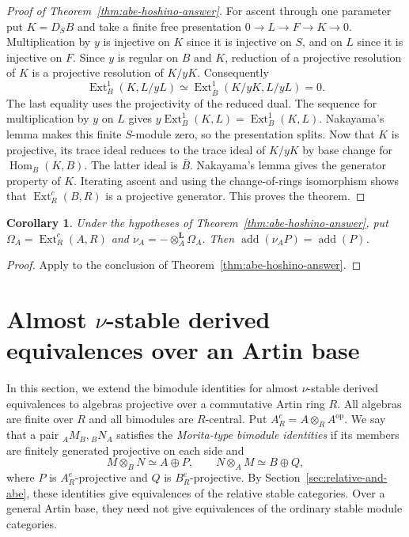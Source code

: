 \documentclass[12pt,a4paper,english,reqno]{amsart}
\numberwithin{equation}{section}
\theoremstyle{plain}
\newtheorem{corollary}[theorem]{Corollary}
\theoremstyle{definition}
\begin{document}
\begin{proof}[Proof of Theorem~\ref{thm:abe-hoshino-answer}]
For ascent through one parameter put $K=D_SB$ and take a finite
free presentation $0\to L\to F\to K\to 0$. Multiplication by
$y$ is injective on $K$ since it is injective on $S$, and on
$L$ since it is injective on $F$. Since $y$ is regular on
$B$ and $K$, reduction of a projective resolution of $K$ is a
projective resolution of $K/yK$. Consequently
\[
 \operatorname{Ext}_B^1(K,L/yL)
  \simeq \operatorname{Ext}_{\bar B}^1(K/yK,L/yL)=0.
\]
The last equality uses the projectivity of the reduced dual.
The sequence for multiplication by $y$ on $L$ gives
$y\operatorname{Ext}_B^1(K,L)=\operatorname{Ext}_B^1(K,L)$.
Nakayama's lemma makes this finite $S$-module zero, so the
presentation splits. Now that $K$ is projective, its trace
ideal reduces to the trace ideal of $K/yK$ by base change
for $\operatorname{Hom}_B(K,B)$. The latter ideal is $\bar B$.
Nakayama's lemma gives the generator property of $K$.
Iterating ascent and using the change-of-rings isomorphism
shows that $\operatorname{Ext}^c_R(B,R)$ is a projective
generator. This proves the theorem.
\end{proof}

\begin{corollary}\label{cor:abe-hoshino-nakayama}
Under the hypotheses of Theorem~\ref{thm:abe-hoshino-answer}, put
$\Omega_A=\operatorname{Ext}_R^c(A,R)$ and
$\nu_A=-\otimes_A^{\mathbf L}\Omega_A$. Then
$\operatorname{add}(\nu_A P)=\operatorname{add}(P)$.
\end{corollary}

\begin{proof}
Apply \cite[Corollary~4.4]{AbeHoshino2009} to the conclusion of
Theorem~\ref{thm:abe-hoshino-answer}.
\end{proof}

\section{Almost \texorpdfstring{$\nu$}{nu}-stable derived equivalences over an Artin base}
\label{anu-sec}

In this section, we extend the bimodule identities for almost
$\nu$-stable derived equivalences to algebras projective over
a commutative Artin ring $R$. All algebras are finite over $R$
and all bimodules are $R$-central. Put
$A_R^e=A\otimes_R A^{\mathrm{op}}$. We say that a pair
${}_A M_B,{}_B N_A$ satisfies the \emph{Morita-type bimodule identities}
if its members are finitely generated projective on each side and
\begin{equation}\label{anu-eq-identities}
 M\otimes_BN\simeq A\oplus P,
 \qquad N\otimes_AM\simeq B\oplus Q,
\end{equation}
where $P$ is $A_R^e$-projective and $Q$ is $B_R^e$-projective.
By Section~\ref{sec:relative-and-abe}, these identities
give equivalences of the relative stable categories.  Over a general
Artin base, they need not give equivalences of the ordinary stable
module categories.
\end{document}

